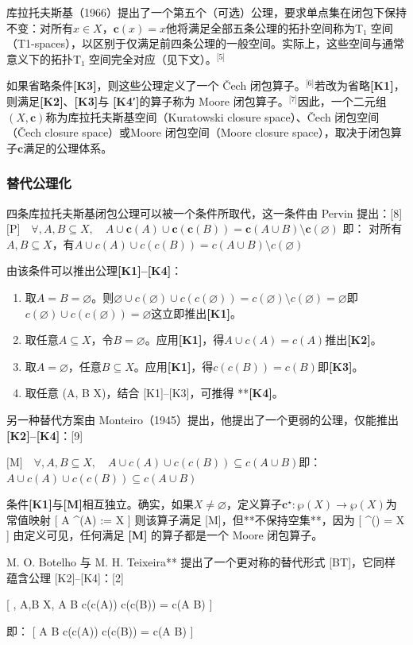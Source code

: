 库拉托夫斯基（1966）提出了一个第五个（可选）公理，要求单点集在闭包下保持不变：对所有$ x \in X $，$\mathbf{c}({x}) = {x}$他将满足全部五条公理的拓扑空间称为T₁ 空间（T1-spaces），以区别于仅满足前四条公理的一般空间。实际上，这些空间与通常意义下的拓扑T₁ 空间完全对应（见下文）。\(^\text{[5]}\)

如果省略条件\textbf{[K3]}，则这些公理定义了一个 Čech 闭包算子。\(^\text{[6]}\)若改为省略\textbf{[K1]}，则满足\textbf{[K2]}、\textbf{[K3]}与 \textbf{[K4′]}的算子称为 Moore 闭包算子。\(^\text{[7]}\)因此，一个二元组$(X, \mathbf{c})$称为库拉托夫斯基空间（Kuratowski closure space）、Čech 闭包空间（Čech closure space）或Moore 闭包空间（Moore closure space），取决于闭包算子$\mathbf{c}$满足的公理体系。
\subsubsection{替代公理化}
四条库拉托夫斯基闭包公理可以被一个条件所取代，这一条件由 Pervin 提出：[8]
$\text{[P]}\quad \forall, A,B \subseteq X, \quad A \cup \mathbf{c}(A) \cup \mathbf{c}(\mathbf{c}(B)) = \mathbf{c}(A \cup B) \setminus \mathbf{c}(\varnothing)$
即：
对所有$A, B \subseteq X$，有$A \cup c(A) \cup c(c(B)) = c(A \cup B) \setminus c(\varnothing)$

由该条件可以推出公理\textbf{[K1]–[K4]}：
\begin{enumerate}
\item 取$A = B = \varnothing$。则$\varnothing \cup c(\varnothing) \cup c(c(\varnothing)) = c(\varnothing) \setminus c(\varnothing) = \varnothing$即$c(\varnothing) \cup c(c(\varnothing)) = \varnothing$这立即推出\textbf{[K1]}。
\item 取任意$A \subseteq X$，令$B = \varnothing$。应用\textbf{[K1]}，得$A \cup c(A) = c(A)$推出\textbf{[K2]}。
\item 取$A = \varnothing$，任意$B \subseteq X$。应用\textbf{[K1]}，得$c(c(B)) = c(B)$即\textbf{[K3]}。
\item 取任意 (A, B \subseteq X)，结合 [K1]–[K3]，可推得 **\textbf{[K4]}。
\end{enumerate}
另一种替代方案由 Monteiro（1945）提出，他提出了一个更弱的公理，仅能推出 \textbf{[K2]–[K4]}：[9]

$\text{[M]}\quad \forall, A,B \subseteq X, \quad A \cup c(A) \cup c(c(B)) \subseteq c(A \cup B)$即：$A \cup c(A) \cup c(c(B)) \subseteq c(A \cup B)$

条件\textbf{[K1]}与\textbf{[M]}相互独立。确实，如果$X \neq \varnothing$，定义算子$\mathbf{c}^\star : \wp(X) \to \wp(X)$为常值映射
[
A \mapsto {}^\star(A) := X
]
则该算子满足 [M]，但**不保持空集**，因为
[
^\star(\varnothing) = X
]
由定义可见，任何满足 \textbf{[M]} 的算子都是一个 Moore 闭包算子。

M. O. Botelho 与 M. H. Teixeira** 提出了一个更对称的替代形式 [BT]，它同样蕴含公理 [K2]–[K4]：[2]

[
\text{[BT]}\quad \forall, A,B \subseteq X, \quad A \cup B \cup c(c(A)) \cup c(c(B)) = c(A \cup B)
]

即：
[
A \cup B \cup c(c(A)) \cup c(c(B)) = c(A \cup B)
]
